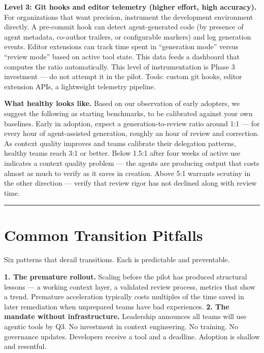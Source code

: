 \documentclass[
  a4paper,
  DIV=11,
  numbers=noendperiod]{scrreprt}
\begin{document}
\textbf{Level 3: Git hooks and editor telemetry (higher effort, high
accuracy).} For organizations that want precision, instrument the
development environment directly. A pre-commit hook can detect
agent-generated code (by presence of agent metadata, co-author trailers,
or configurable markers) and log generation events. Editor extensions
can track time spent in ``generation mode'' versus ``review mode'' based
on active tool state. This data feeds a dashboard that computes the
ratio automatically. This level of instrumentation is Phase 3 investment
--- do not attempt it in the pilot. Tools: custom git hooks, editor
extension APIs, a lightweight telemetry pipeline.

\textbf{What healthy looks like.} Based on our observation of early
adopters, we suggest the following as starting benchmarks, to be
calibrated against your own baselines. Early in adoption, expect a
generation-to-review ratio around 1:1 --- for every hour of
agent-assisted generation, roughly an hour of review and correction. As
context quality improves and teams calibrate their delegation patterns,
healthy teams reach 3:1 or better. Below 1.5:1 after four weeks of
active use indicates a context quality problem --- the agents are
producing output that costs almost as much to verify as it saves in
creation. Above 5:1 warrants scrutiny in the other direction --- verify
that review rigor has not declined along with review time.

\begin{center}\rule{0.5\linewidth}{0.5pt}\end{center}

\section{Common Transition Pitfalls}\label{common-transition-pitfalls}

Six patterns that derail transitions. Each is predictable and
preventable.

\textbf{1. The premature rollout.} Scaling before the pilot has produced
structural lessons --- a working context layer, a validated review
process, metrics that show a trend. Premature acceleration typically
costs multiples of the time saved in later remediation when unprepared
teams have bad experiences. \textbf{2. The mandate without
infrastructure.} Leadership announces all teams will use agentic tools
by Q3. No investment in context engineering. No training. No governance
updates. Developers receive a tool and a deadline. Adoption is shallow
and resentful.
\end{document}
